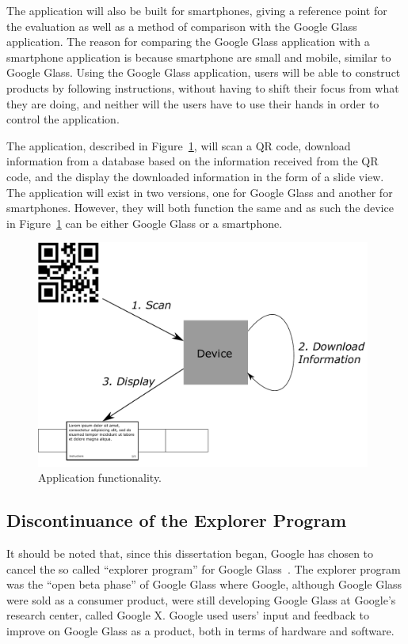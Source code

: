The application will also be built for smartphones, giving a reference point for the evaluation as well as a method of comparison with the Google Glass application. The reason for comparing the Google Glass application with a smartphone application is because smartphone are small and mobile, similar to Google Glass. Using the Google Glass application, users will be able to construct products by following instructions, without having to shift their focus from what they are doing, and neither will the users have to use their hands in order to control the application.

The application, described in Figure~\ref{projectmapLightVersion}, will scan a QR code, download information from a database based on the information received from the QR code, and the display the downloaded information in the form of a slide view. The application will exist in two versions, one for Google Glass and another for smartphones. However, they will both function the same and as such the device in Figure~\ref{projectmapLightVersion} can be either Google Glass or a smartphone.

	\begin{figure}[ht!]
		\centering
		\includegraphics[width=110mm]{images/projectmapLightVersion}
		\caption{Application functionality.}
		\label{projectmapLightVersion}
	\end{figure}

\subsection{Discontinuance of the Explorer Program}
It should be noted that, since this dissertation began, Google has chosen to cancel the so called ``explorer program'' for Google Glass~\cite{glassDiscontinued}. The explorer program was the ``open beta phase'' of Google Glass where Google, although Google Glass were sold as a consumer product, were still developing Google Glass at Google's research center, called Google X. Google used users' input and feedback to improve on Google Glass as a product, both in terms of hardware and software.

